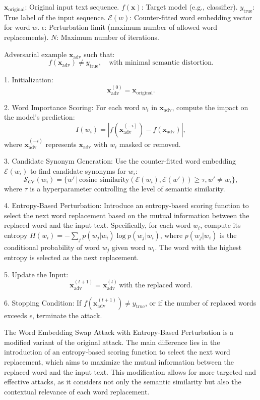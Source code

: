 $\mathbf{x}_{\text{original}}$: Original input text sequence.  
$f(\mathbf{x})$: Target model (e.g., classifier).  
$y_{\text{true}}$: True label of the input sequence.  
$\mathcal{E}(w)$: Counter-fitted word embedding vector for word $w$.  
$\epsilon$: Perturbation limit (maximum number of allowed word replacements).  
$N$: Maximum number of iterations.

Adversarial example $\mathbf{x}_{\text{adv}}$ such that:  
\[
f(\mathbf{x}_{\text{adv}}) \neq y_{\text{true}}, \quad \text{with minimal semantic distortion}.
\]

1. Initialization:  
   \[
   \mathbf{x}_{\text{adv}}^{(0)} = \mathbf{x}_{\text{original}}.
   \]

2. Word Importance Scoring: For each word $w_i$ in $\mathbf{x}_{\text{adv}}$, compute the impact on the model's prediction:  
     \[
     I(w_i) = |f(\mathbf{x}_{\text{adv}}^{(-i)}) - f(\mathbf{x}_{\text{adv}})|,
     \]  
     where $\mathbf{x}_{\text{adv}}^{(-i)}$ represents $\mathbf{x}_{\text{adv}}$ with $w_i$ masked or removed.

3. Candidate Synonym Generation: Use the counter-fitted word embedding $\mathcal{E}(w_i)$ to find candidate synonyms for $w_i$:  
     \[
     \mathcal{S}_{CF}(w_i) = \{w' \,|\, \text{cosine similarity}(\mathcal{E}(w_i), \mathcal{E}(w')) \geq \tau, w' \neq w_i\},
     \]  
     where $\tau$ is a hyperparameter controlling the level of semantic similarity.

4. Entropy-Based Perturbation: Introduce an entropy-based scoring function to select the next word replacement based on the mutual information between the replaced word and the input text. Specifically, for each word $w_i$, compute its entropy $H(w_i) = -\sum_{j} p(w_j | w_i) \log p(w_j | w_i)$, where $p(w_j | w_i)$ is the conditional probability of word $w_j$ given word $w_i$. The word with the highest entropy is selected as the next replacement.

5. Update the Input:  
   \[
   \mathbf{x}_{\text{adv}}^{(t+1)} = \mathbf{x}_{\text{adv}}^{(t)} \, \text{with the replaced word}.
   \]

6. Stopping Condition: If $f(\mathbf{x}_{\text{adv}}^{(t+1)}) \neq y_{\text{true}}$, or if the number of replaced words exceeds $\epsilon$, terminate the attack.

The Word Embedding Swap Attack with Entropy-Based Perturbation is a modified variant of the original attack. The main difference lies in the introduction of an entropy-based scoring function to select the next word replacement, which aims to maximize the mutual information between the replaced word and the input text. This modification allows for more targeted and effective attacks, as it considers not only the semantic similarity but also the contextual relevance of each word replacement.